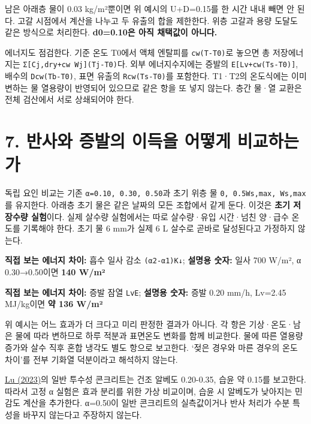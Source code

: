 \documentclass[11pt,a4paper]{article}
\begin{document}
남은 아래층 물이 0.03 kg/m²뿐이면 위 예시의 U+D=0.15를 한 시간 내내 빼면 안 된다. 고갈 시점에서 계산을 나누고 두 유출의 합을 제한한다. 위층 고갈과 용량 도달도 같은 방식으로 처리한다. \textbf{d0=0.10은 아직 채택값이 아니다.}

에너지도 점검한다. 기준 온도 T0에서 액체 엔탈피를 \texttt{cw(T-T0)}로 놓으면 총 저장에너지는 \texttt{Σ[Cj,dry+cw Wj](Tj-T0)}다. 외부 에너지수지에는 증발의 \texttt{E[Lv+cw(Ts-T0)]}, 배수의 \texttt{Dcw(Tb-T0)}, 표면 유출의 \texttt{Rcw(Ts-T0)}를 포함한다. T1·T2의 온도식에는 이미 변하는 물 열용량이 반영되어 있으므로 같은 항을 또 넣지 않는다. 층간 물·열 교환은 전체 검산에서 서로 상쇄되어야 한다.

\section{7. 반사와 증발의 이득을 어떻게 비교하는가}

독립 요인 비교는 기존 \texttt{α=0.10, 0.30, 0.50}과 초기 위층 물 \texttt{0, 0.5Ws,max, Ws,max}를 유지한다. 아래층 초기 물은 같은 날짜의 모든 조합에서 같게 둔다. 이것은 \textbf{초기 저장수량 실험}이다. 실제 살수량 실험에서는 따로 살수량·유입 시간·넘친 양·급수 온도를 기록해야 한다. 초기 물 6 mm가 실제 6 L 살수로 곧바로 달성된다고 가정하지 않는다.

\begin{description}[leftmargin=0pt,style=nextline]
\item[알베도 α] \textbf{직접 보는 에너지 차이:} 흡수 일사 감소 \texttt{(α2-α1)K↓}; \textbf{설명용 숫자:} 일사 700 W/m², α 0.30→0.50이면 \textbf{140 W/m²}
\item[증발 E] \textbf{직접 보는 에너지 차이:} 증발 잠열 \texttt{LvE}; \textbf{설명용 숫자:} 증발 0.20 mm/h, Lv=2.45 MJ/kg이면 \textbf{약 136 W/m²}
\end{description}

위 예시는 어느 효과가 더 크다고 미리 판정한 결과가 아니다. 각 항은 기상·온도·남은 물에 따라 변하므로 하루 적분과 표면온도 변화를 함께 비교한다. 물에 따른 열용량 증가와 살수 직후 혼합 냉각도 별도 항으로 보고한다. ‘젖은 경우와 마른 경우의 온도 차이’를 전부 기화열 덕분이라고 해석하지 않는다.

\href{\detokenize{https://doi.org/10.3390/su15108222}}{Lu (2023)}의 일반 투수성 콘크리트는 건조 알베도 0.20-0.35, 습윤 약 0.15를 보고한다. 따라서 고정 α 실험은 효과 분리를 위한 가상 비교이며, 습윤 시 알베도가 낮아지는 민감도 계산을 추가한다. α=0.50이 일반 콘크리트의 실측값이거나 반사 처리가 수분 특성을 바꾸지 않는다고 주장하지 않는다.
\end{document}
